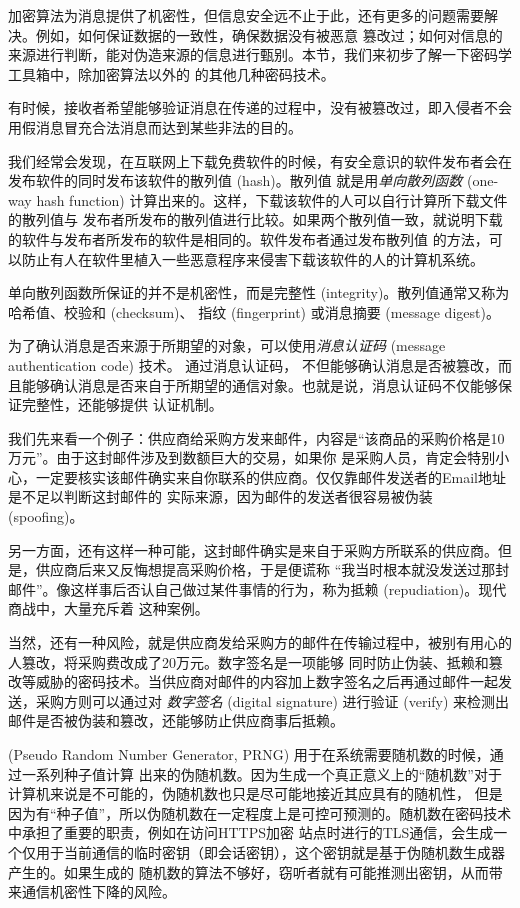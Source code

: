 
\startsection[title={其他密码技术}]

加密算法为消息提供了机密性，但信息安全远不止于此，还有更多的问题需要解决。例如，如何保证数据的一致性，确保数据没有被恶意
篡改过；如何对信息的来源进行判断，能对伪造来源的信息进行甄别。本节，我们来初步了解一下密码学工具箱中，除加密算法以外的
的其他几种密码技术。

\startsubsection[title={单向散列函数}]

有时候，接收者希望能够验证消息在传递的过程中，没有被篡改过，即入侵者不会用假消息冒充合法消息而达到某些非法的目的。

我们经常会发现，在互联网上下载免费软件的时候，有安全意识的软件发布者会在发布软件的同时发布该软件的散列值 (hash)。散列值
就是用{\it 单向散列函数} (one-way hash function) 计算出来的。这样，下载该软件的人可以自行计算所下载文件的散列值与
发布者所发布的散列值进行比较。如果两个散列值一致，就说明下载的软件与发布者所发布的软件是相同的。软件发布者通过发布散列值
的方法，可以防止有人在软件里植入一些恶意程序来侵害下载该软件的人的计算机系统。

单向散列函数所保证的并不是机密性，而是完整性 (integrity)。散列值通常又称为哈希值、校验和 (checksum)、
指纹 (fingerprint) 或消息摘要 (message digest)。
\stopsubsection

\startsubsection[title={消息认证码}]
为了确认消息是否来源于所期望的对象，可以使用{\it 消息认证码} (message authentication code) 技术。 通过消息认证码，
不但能够确认消息是否被篡改，而且能够确认消息是否来自于所期望的通信对象。也就是说，消息认证码不仅能够保证完整性，还能够提供
认证机制。
\stopsubsection

\startsubsection[title={数字签名}]
我们先来看一个例子：供应商给采购方发来邮件，内容是“该商品的采购价格是10万元”。由于这封邮件涉及到数额巨大的交易，如果你
是采购人员，肯定会特别小心，一定要核实该邮件确实来自你联系的供应商。仅仅靠邮件发送者的Email地址是不足以判断这封邮件的
实际来源，因为邮件的发送者很容易被伪装 (spoofing)。

另一方面，还有这样一种可能，这封邮件确实是来自于采购方所联系的供应商。但是，供应商后来又反悔想提高采购价格，于是便谎称
“我当时根本就没发送过那封邮件”。像这样事后否认自己做过某件事情的行为，称为抵赖 (repudiation)。现代商战中，大量充斥着
这种案例。

当然，还有一种风险，就是供应商发给采购方的邮件在传输过程中，被别有用心的人篡改，将采购费改成了20万元。数字签名是一项能够
同时防止伪装、抵赖和篡改等威胁的密码技术。当供应商对邮件的内容加上数字签名之后再通过邮件一起发送，采购方则可以通过对
{\it 数字签名} (digital signature) 进行验证 (verify) 来检测出邮件是否被伪装和篡改，还能够防止供应商事后抵赖。
\stopsubsection


 (Pseudo Random Number Generator, PRNG) 用于在系统需要随机数的时候，通过一系列种子值计算
出来的伪随机数。因为生成一个真正意义上的“随机数”对于计算机来说是不可能的，伪随机数也只是尽可能地接近其应具有的随机性，
但是因为有“种子值”，所以伪随机数在一定程度上是可控可预测的。随机数在密码技术中承担了重要的职责，例如在访问HTTPS加密
站点时进行的TLS通信，会生成一个仅用于当前通信的临时密钥（即会话密钥），这个密钥就是基于伪随机数生成器产生的。如果生成的
随机数的算法不够好，窃听者就有可能推测出密钥，从而带来通信机密性下降的风险。
\stopsubsection

\stopsection
